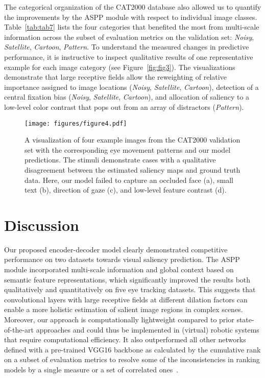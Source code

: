 \documentclass[final,1p,times,number]{elsarticle}
\begin{document}
The categorical organization of the CAT2000 database also allowed us to quantify the improvements by the ASPP module with respect to individual image classes. Table~\ref{tab:tab7} lists the four categories that benefited the most from multi-scale information across the subset of evaluation metrics on the validation set: \textit{Noisy}, \textit{Satellite}, \textit{Cartoon}, \textit{Pattern}. To understand the measured changes in predictive performance, it is instructive to inspect qualitative results of one representative example for each image category (see Figure~\ref{fig:fig3}). The visualizations demonstrate that large receptive fields allow the reweighting of relative importance assigned to image locations (\textit{Noisy}, \textit{Satellite}, \textit{Cartoon}), detection of a central fixation bias (\textit{Noisy}, \textit{Satellite}, \textit{Cartoon}), and allocation of saliency to a low-level color contrast that pops out from an array of distractors (\textit{Pattern}).

\begin{figure}[t!]
\centering\texttt{[image: figures/figure4.pdf]}
\caption{A visualization of four example images from the CAT2000 validation set with the corresponding eye movement patterns and our model predictions. The stimuli demonstrate cases with a qualitative disagreement between the estimated saliency maps and ground truth data. Here, our model failed to capture an occluded face (a), small text (b), direction of gaze (c), and low-level feature contrast (d).}
\label{fig:fig4}
\end{figure}

\section{Discussion}

Our proposed encoder-decoder model clearly demonstrated competitive performance on two datasets towards visual saliency prediction. The ASPP module incorporated multi-scale information and global context based on semantic feature representations, which significantly improved the results both qualitatively and quantitatively on five eye tracking datasets. This suggests that convolutional layers with large receptive fields at different dilation factors can enable a more holistic estimation of salient image regions in complex scenes. Moreover, our approach is computationally lightweight compared to prior state-of-the-art approaches and could thus be implemented in (virtual) robotic systems that require computational efficiency. It also outperformed all other networks defined with a pre-trained VGG16 backbone as calculated by the cumulative rank on a subset of evaluation metrics to resolve some of the inconsistencies in ranking models by a single measure or a set of correlated ones~\cite{riche2013saliency,bylinskii2018different}.
\end{document}
